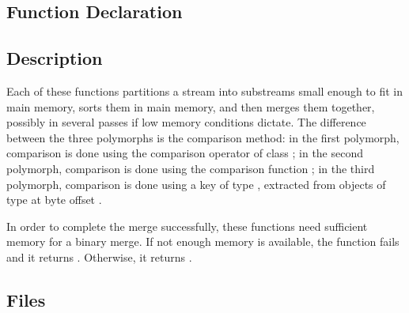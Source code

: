 \subsection{Function Declaration}
  \btabb
     {}
     {}
     {}
  \etabb

\subsection{Description}
Each of these functions partitions a stream into substreams small
enough to fit in main memory, sorts them in main memory, and then
merges them together, possibly in several passes if low memory conditions
dictate. The difference between the three polymorphs is the comparison
method: in the first polymorph, comparison is done using the comparison
operator of class ; in the second polymorph, comparison is done
using the comparison function ; in the third polymorph,
comparison is done using a key of type , extracted from objects
of type  at byte offset .

In order to complete the merge successfully, these functions need sufficient
memory for a binary merge. If not enough memory is available, the function
fails and it returns
. Otherwise, it returns
.


\subsection{Files}
  \btabb
     {}
  \etabb

